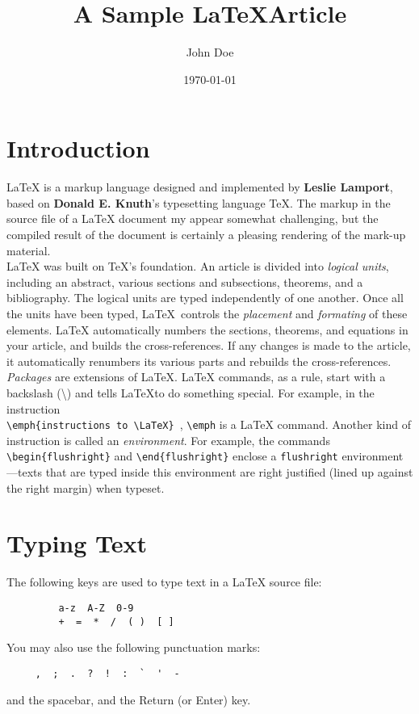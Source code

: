 \documentclass[12pt]{article}
\begin{document}
\title{A Sample \LaTeX \;Article}
\author{John Doe}
\date{\today}
\maketitle
{}

\section{Introduction}
\LaTeX \; is a markup language designed and implemented by \textbf{Leslie Lamport}, based on \textbf{Donald E. Knuth}'s typesetting language \TeX.  The markup in the source file of a \LaTeX \; document my appear somewhat challenging, but the compiled result of the document is certainly a pleasing rendering of the mark-up material.\\

\LaTeX \; was built on \TeX 's foundation.  An article is divided into \emph{logical units}, including an abstract, various sections and subsections, theorems, and a bibliography.  The logical units are typed independently of one another.  Once all the units have been typed, \LaTeX \, controls the \emph{placement} and \emph{formating} of these elements. \LaTeX \; automatically numbers the sections, theorems, and equations in your article, and builds the cross-references.  If any changes is made to the article, it automatically renumbers its various parts and rebuilds the cross-references.\\

\emph{Packages} are extensions of \LaTeX.  \LaTeX \; commands, as a rule, start with a backslash (\textbackslash) and tells \LaTeX  to do something special. For example, in the instruction\\
\verb+\emph{instructions to \LaTeX} +, \verb+\emph+ is a \LaTeX \; command. Another kind of instruction is called an \emph{environment}. For example, the commands \verb+\begin{flushright}+ and \verb+\end{flushright}+ enclose a \verb+flushright+ environment---texts that are typed inside this environment are right justified (lined up against the right margin) when typeset.

\section{Typing Text}
The following keys are used to type text in a \LaTeX \; source file: 
\begin{center}
   \begin{verbatim}
         a-z  A-Z  0-9
         +  =  *  /  ( )  [ ]
   \end{verbatim}
\end{center}
You may also use the following punctuation marks:
\begin{center}
   \begin{verbatim}
     ,  ;  .  ?  !  :  `  '  -
   \end{verbatim}
\end{center}
and the spacebar, and the Return (or Enter) key.\\
\end{document}
